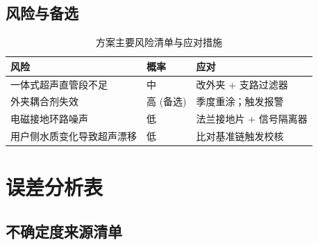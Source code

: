 \documentclass[11pt,a4paper]{ctexart}
\begin{document}
\subsection{风险与备选}

\begin{table}[H]
\centering
\caption{方案主要风险清单与应对措施}
\small
\begin{tabular}{llp{6.0cm}}
\toprule
风险 & 概率 & 应对 \\
\midrule
一体式超声直管段不足     & 中    & 改外夹 + 支路过滤器 \\
外夹耦合剂失效             & 高 (备选) & 季度重涂；触发报警 \\
电磁接地环路噪声           & 低    & 法兰接地片 + 信号隔离器 \\
用户侧水质变化导致超声漂移 & 低    & 比对基准链触发校核 \\
\bottomrule
\end{tabular}
\end{table}

\section{误差分析表}\label{app:uncertainty}

\subsection{不确定度来源清单}
\end{document}
